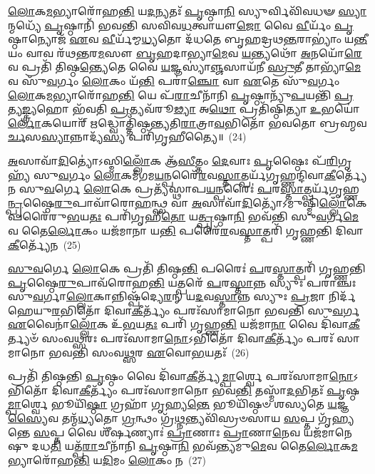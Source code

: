 \-\ul{𑌲𑍋}\-𑌕\-\ul{𑌮}\-𑌭𑍍𑌯𑌾𑌰𑍋᳴𑌹\-\ul{𑌨𑍍𑌤𑌿} 𑌯\-\ul{𑌦}\-𑌨𑍍𑌯𑌤𑌃᳴ \ul{𑌪𑍃}\-𑌷𑍍𑌠𑌾\-\ul{𑌨𑌿} 𑌸𑍍𑌯𑍁𑌰𑍍𑌵𑌿𑌵𑌿᳴𑌵𑌧𑍟 \ul{𑌸𑍍𑌯𑌾}\-𑌨𑍍𑌮𑌧𑍍𑌯𑍇᳴ \ul{𑌪𑍃}\-𑌷𑍍𑌠𑌾𑌨𑌿᳴ 𑌭𑌵𑌨𑍍𑌤𑌿 𑌸𑌵𑌿𑌵\-\ul{𑌧}\-𑌤𑍍𑌵𑌾𑌯𑍗\-\ul{𑌜𑍋} 𑌵𑍈 \ul{𑌵𑍀}\-𑌰𑍍𑌯𑌂᳴ \ul{𑌪𑍃}\-𑌷𑍍𑌠𑌾𑌨𑍍𑌯𑍋𑌜᳴ \ul{𑌏}\-𑌵 \ul{𑌵𑍀}\-𑌰𑍍𑌯᳴𑌮𑍍𑌮\-\ul{𑌧𑍍𑌯}\-𑌤𑍋 𑌦᳴𑌧𑌤𑍇 𑌬𑍃𑌹𑌦𑍍𑌰𑌥\-\ul{𑌨𑍍𑌤}\-𑌰𑌾\-𑌭𑍍𑌯𑌾𑌂॑ 𑌯\-\ul{𑌨𑍍𑌤𑍀}\-𑌯𑌂 𑌵𑌾𑌵 𑌰᳴𑌥\-\ul{𑌨𑍍𑌤}\-𑌰\-\ul{𑌮}\-𑌸𑍗 \ul{𑌬𑍃}\-𑌹𑌦𑌾𑌭𑍍𑌯𑌾\-\ul{𑌮𑍇}\-𑌵 \ul{𑌯}\-𑌨𑍍𑌤𑍍𑌯𑌥𑍋᳴ \ul{𑌅}\-𑌨𑌯𑍋᳴\-\ul{𑌰𑍇}\-𑌵 𑌪𑍍𑌰𑌤𑌿᳴ 𑌤𑌿𑌷𑍍𑌠\-\ul{𑌨𑍍𑌤𑍍𑌯𑍇}\-𑌤𑍇 𑌵𑍈 \ul{𑌯}\-𑌜𑍍𑌞𑌸𑍍𑌯𑌾॑\-\ul{𑌞𑍍𑌜}\-𑌸𑌾𑌯᳴𑌨𑍀 \ul{𑌸𑍍𑌰𑍁}\-𑌤𑍀 𑌤𑌾𑌭𑍍𑌯𑌾᳴\-\ul{𑌮𑍇}\-𑌵 𑌸𑍁᳴\-\ul{𑌵}\-𑌰𑍍𑌗𑌂 \ul{𑌲𑍋}\-𑌕𑌂 𑌯᳴\-\ul{𑌨𑍍𑌤𑌿} 𑌪𑌰𑌾॑\-\ul{𑌞𑍍𑌚𑍋} 𑌵𑌾 \ul{𑌏}\-𑌤𑍇 𑌸𑍁᳴\-\ul{𑌵}\-𑌰𑍍𑌗𑌂 \ul{𑌲𑍋}\-𑌕\-\ul{𑌮}\-𑌭𑍍𑌯𑌾𑌰𑍋᳴𑌹\-\ul{𑌨𑍍𑌤𑌿} 𑌯𑍇 𑌪᳴\-\ul{𑌰𑌾}\-𑌚𑍀𑌨𑌾᳴𑌨𑌿 \ul{𑌪𑍃}\-𑌷𑍍𑌠𑌾𑌨𑍍𑌯𑍁᳴\-\ul{𑌪}\-𑌯𑌨𑍍𑌤𑌿᳴ \ul{𑌪𑍍𑌰}\-𑌤𑍍𑌯\-\ul{𑌙𑍍𑌤𑍍𑌰𑍍𑌯}\-𑌹𑍋 𑌭᳴𑌵𑌤𑌿 \ul{𑌪𑍍𑌰}\-𑌤𑍍𑌯𑌵᳴𑌰𑍂\-\ul{𑌢𑍍𑌯𑌾} 𑌅\-\ul{𑌥𑍋} 𑌪𑍍𑌰𑌤𑌿᳴𑌷𑍍𑌠𑌿𑌤𑍍𑌯𑌾 \ul{𑌉}\-𑌭𑌯𑍋॑\-\ul{𑌰𑍍𑌲𑍋}\-𑌕𑌯𑍋𑌰𑍍᳴ \ul{𑌋}\-𑌦𑍍𑌧𑍍𑌵𑍋𑌤𑍍𑌤𑌿᳴𑌷𑍍𑌠𑌨𑍍𑌤𑍍𑌯𑌤𑌿\-\ul{𑌰𑌾}\-𑌤𑍍𑌰𑌾\-\ul{𑌵}\-𑌭𑌿𑌤𑍋᳴ 𑌭𑌵𑌤𑍋 𑌬𑍍𑌰𑌹𑍍𑌮𑌵\-\ul{𑌰𑍍𑌚}\-𑌸\-\ul{𑌸𑍍𑌯𑌾}\-𑌨𑍍𑌨𑌾𑌦𑍍𑌯᳴\-\ul{𑌸𑍍𑌯} 𑌪𑌰𑌿᳴𑌗𑍃𑌹𑍀𑌤𑍍𑌯𑍈॥~(24)

{\anuvakamend[{\-\ul{𑌵𑍃}\-\-\ul{𑌞𑍍𑌜}\-\-\ul{𑌤𑍇} 𑌬𑍍𑌰\-\ul{𑌹𑍍𑌮} 𑌚𑌾𑌨𑍍𑌨᳴𑌞𑍍𑌚 𑌸𑍁\-\ul{𑌵}\-𑌰𑍍𑌗\-\ul{𑌮𑍇}\-𑌤𑍇 𑌸𑍁᳴\-\ul{𑌵}\-𑌰𑍍𑌗𑌨𑍍𑌤𑍍𑌰𑌯𑍋᳴𑌵𑌿𑍞𑌶𑌤𑌿𑌶𑍍𑌚}]}%

\-\ul{𑌅}\-𑌸𑌾𑌵𑌾᳴\-\ul{𑌦𑌿}\-𑌤𑍍𑌯𑍋॑\-𑌽𑌸𑍍𑌮𑌿\-\ul{𑌲𑍍𑌲𑍋𑌁}\-𑌕 𑌆᳴\-\ul{𑌸𑍀}\-𑌤𑍍𑌤𑌂 \ul{𑌦𑍇}\-𑌵𑌾𑌃 \ul{𑌪𑍃}\-𑌷𑍍𑌠𑍈𑌃 𑌪᳴\-\ul{𑌰𑌿}\-𑌗𑍃𑌹𑍍𑌯᳴ 𑌸𑍁\-\ul{𑌵}\-𑌰𑍍𑌗𑌂 \ul{𑌲𑍋}\-𑌕𑌮᳴𑌗𑌮\-\ul{𑌯}\-𑌨𑍍𑌪𑌰𑍈᳴\-\ul{𑌰}\-𑌵\-\ul{𑌸𑍍𑌤𑌾}\-𑌤𑍍𑌪𑌰𑍍𑌯᳴𑌗𑍃𑌹𑍍𑌣𑌨𑍍𑌦𑌿𑌵𑌾\-\ul{𑌕𑍀}\-𑌰𑍍𑌤𑍍𑌯𑍇᳴𑌨 𑌸𑍁\-\ul{𑌵}\-𑌰𑍍𑌗𑍇 \ul{𑌲𑍋}\-𑌕𑍇 𑌪𑍍𑌰𑌤𑍍𑌯᳴𑌸𑍍𑌥𑌾𑌪\-\ul{𑌯}\-𑌨𑍍𑌪𑌰𑍈𑌃॑ \ul{𑌪}\-𑌰\-\ul{𑌸𑍍𑌤𑌾}\-𑌤𑍍𑌪𑌰𑍍𑌯᳴𑌗𑍃𑌹𑍍𑌣\-\ul{𑌨𑍍𑌪𑍃}\-𑌷𑍍𑌠𑍈\-\ul{𑌰𑍁}\-𑌪𑌾𑌵𑌾᳴𑌰𑍋\-\ul{𑌹}\-𑌨𑍍𑌥𑍍𑌸 𑌵𑌾 \ul{𑌅}\-𑌸𑌾𑌵𑌾᳴\-\ul{𑌦𑌿}\-𑌤𑍍𑌯𑍋᳴\-𑌽𑌮𑍁𑌷𑍍𑌮𑌿᳴\-\ul{𑌲𑍍𑌲𑍋𑌁}\-𑌕𑍇 𑌪𑌰𑍈᳴𑌰𑍁\-\ul{𑌭}\-𑌯\-\ul{𑌤𑌃} 𑌪𑌰𑌿᳴𑌗𑍃𑌹𑍀\-\ul{𑌤𑍋} 𑌯\-\ul{𑌤𑍍𑌪𑍃}\-𑌷𑍍𑌠𑌾\-\ul{𑌨𑌿} 𑌭𑌵᳴𑌨𑍍𑌤𑌿 𑌸𑍁\-\ul{𑌵}\-𑌰𑍍𑌗\-\ul{𑌮𑍇}\-𑌵 𑌤𑍈\-\ul{𑌰𑍍𑌲𑍋}\-𑌕𑌂 𑌯𑌜᳴𑌮𑌾𑌨𑌾 𑌯\-\ul{𑌨𑍍𑌤𑌿} 𑌪𑌰𑍈᳴\-\ul{𑌰}\-𑌵\-\ul{𑌸𑍍𑌤𑌾}\-𑌤𑍍𑌪𑌰𑌿᳴ 𑌗𑍃𑌹𑍍𑌣𑌨𑍍𑌤𑌿 𑌦𑌿𑌵𑌾\-\ul{𑌕𑍀}\-𑌰𑍍𑌤𑍍𑌯𑍇᳴𑌨~(25)

\-\ul{𑌸𑍁}\-\-\ul{𑌵}\-𑌰𑍍𑌗𑍇 \ul{𑌲𑍋}\-𑌕𑍇 𑌪𑍍𑌰𑌤𑌿᳴ 𑌤𑌿𑌷𑍍𑌠\-\ul{𑌨𑍍𑌤𑌿} 𑌪𑌰𑍈𑌃॑ \ul{𑌪}\-𑌰\-\ul{𑌸𑍍𑌤𑌾}\-𑌤𑍍𑌪𑌰𑌿᳴ 𑌗𑍃𑌹𑍍𑌣𑌨𑍍𑌤𑌿 \ul{𑌪𑍃}\-𑌷𑍍𑌠𑍈\-\ul{𑌰𑍁}\-𑌪𑌾𑌵᳴𑌰𑍋𑌹\-\ul{𑌨𑍍𑌤𑌿} 𑌯𑌤𑍍𑌪𑌰𑍇᳴ \ul{𑌪}\-𑌰\-\ul{𑌸𑍍𑌤𑌾}\-𑌨𑍍𑌨 𑌸𑍍𑌯𑍁𑌃 𑌪𑌰𑌾॑𑌞𑍍𑌚𑌃 𑌸𑍁\-\ul{𑌵}\-𑌰𑍍𑌗𑌾\-\ul{𑌲𑍍𑌲𑍋}\-𑌕𑌾𑌨𑍍𑌨𑌿𑌷𑍍𑌪᳴𑌦𑍍𑌯𑍇\-\ul{𑌰}\-𑌨𑍍 𑌯\-\ul{𑌦}\-𑌵\-\ul{𑌸𑍍𑌤𑌾}\-𑌨𑍍𑌨 𑌸𑍍𑌯𑍁𑌃 \ul{𑌪𑍍𑌰}\-𑌜𑌾 𑌨𑌿𑌰𑍍𑌦᳴𑌹𑍇𑌯𑍁\-\ul{𑌰}\-𑌭𑌿𑌤𑍋᳴ 𑌦𑌿𑌵𑌾\-\ul{𑌕𑍀}\-𑌰𑍍𑌤𑍍𑌯𑌂᳴ 𑌪𑌰𑌃᳴𑌸𑌾𑌮𑌾𑌨𑍋 𑌭𑌵𑌨𑍍𑌤𑌿 𑌸𑍁\-\ul{𑌵}\-𑌰𑍍𑌗 \ul{𑌏}\-𑌵𑍈𑌨𑌾॑\-\ul{𑌲𑍍𑌲𑍋𑌁}\-𑌕 𑌉᳴\-\ul{𑌭}\-𑌯\-\ul{𑌤𑌃} 𑌪𑌰𑌿᳴ 𑌗𑍃𑌹𑍍𑌣\-\ul{𑌨𑍍𑌤𑌿} 𑌯𑌜᳴𑌮𑌾\-\ul{𑌨𑌾} 𑌵𑍈 𑌦𑌿᳴𑌵𑌾\-\ul{𑌕𑍀}\-𑌰𑍍𑌤𑍍𑌯𑍞᳴ 𑌸𑌂𑌵\-\ul{𑌥𑍍𑌸}\-𑌰𑌃 𑌪𑌰𑌃᳴𑌸𑌾𑌮𑌾\-\ul{𑌨𑍋}\-\-𑌽𑌭𑌿𑌤𑍋᳴ 𑌦𑌿𑌵𑌾\-\ul{𑌕𑍀}\-𑌰𑍍𑌤𑍍𑌯𑌂᳴ 𑌪𑌰𑌃᳴ 𑌸𑌾𑌮𑌾𑌨𑍋 𑌭𑌵𑌨𑍍𑌤𑌿 𑌸𑌂𑌵\-\ul{𑌥𑍍𑌸}\-𑌰 \ul{𑌏}\-𑌵𑍋\-\ul{𑌭}\-𑌯𑌤𑌃᳴~(26)

𑌪𑍍𑌰𑌤𑌿᳴ 𑌤𑌿𑌷𑍍𑌠𑌨𑍍𑌤𑌿 \ul{𑌪𑍃}\-𑌷𑍍𑌠𑌂 𑌵𑍈 𑌦𑌿᳴𑌵𑌾\-\ul{𑌕𑍀}\-𑌰𑍍𑌤𑍍𑌯᳴\-\ul{𑌮𑍍𑌪𑌾}\-𑌰𑍍𑌶𑍍𑌵𑍇 𑌪𑌰𑌃᳴𑌸𑌾𑌮𑌾\-\ul{𑌨𑍋}\-\-𑌽𑌭𑌿𑌤𑍋᳴ 𑌦𑌿𑌵𑌾\-\ul{𑌕𑍀}\-𑌰𑍍𑌤𑍍𑌯𑌂᳴ 𑌪𑌰𑌃᳴𑌸𑌾𑌮𑌾𑌨𑍋 𑌭𑌵\-\ul{𑌨𑍍𑌤𑌿} 𑌤𑌸𑍍𑌮𑌾᳴\-\ul{𑌦}\-𑌭𑌿𑌤𑌃᳴ \ul{𑌪𑍃}\-𑌷𑍍𑌠\-\ul{𑌮𑍍𑌪𑌾}\-𑌰𑍍𑌶𑍍𑌵𑍇 𑌭𑍂𑌯𑌿᳴\-\ul{𑌷𑍍𑌠𑌾} 𑌗𑍍𑌰𑌹𑌾᳴ 𑌗𑍃𑌹𑍍𑌯\-\ul{𑌨𑍍𑌤𑍇} 𑌭𑍂𑌯𑌿᳴𑌷𑍍𑌠𑍞 𑌶𑌸𑍍𑌯𑌤𑍇 \ul{𑌯}\-𑌜𑍍𑌞\-\ul{𑌸𑍍𑌯𑍈}\-𑌵 𑌤𑌨𑍍𑌮᳴\-\ul{𑌧𑍍𑌯}\-𑌤𑍋 \ul{𑌗𑍍𑌰}\-𑌨𑍍𑌥𑌂 𑌗𑍍𑌰᳴\-\ul{𑌥𑍍𑌨}\-𑌨𑍍𑌤𑍍𑌯𑌵𑌿᳴𑌸𑍍𑌰𑍞𑌸𑌾𑌯 \ul{𑌸}\-𑌪𑍍𑌤 𑌗𑍃᳴𑌹𑍍𑌯𑌨𑍍𑌤𑍇 \ul{𑌸}\-𑌪𑍍𑌤 𑌵𑍈 𑌶𑍀᳴𑌰𑍍\mbox{}\-\ul{𑌷}\-𑌣𑍍𑌯𑌾𑌃॑ \ul{𑌪𑍍𑌰𑌾}\-𑌣𑌾𑌃 \ul{𑌪𑍍𑌰𑌾}\-𑌣𑌾\-\ul{𑌨𑍇}\-𑌵 𑌯𑌜᳴𑌮𑌾𑌨𑍇𑌷𑍁 𑌦𑌧\-\ul{𑌤𑌿} 𑌯𑌤𑍍𑌪᳴\-\ul{𑌰𑌾}\-𑌚𑍀𑌨𑌾᳴𑌨𑌿 \ul{𑌪𑍃}\-𑌷𑍍𑌠𑌾\-\ul{𑌨𑌿} 𑌭𑌵᳴\-\ul{𑌨𑍍𑌤𑍍𑌯}\-𑌮𑍁\-\ul{𑌮𑍇}\-𑌵 𑌤𑍈\-\ul{𑌰𑍍𑌲𑍋}\-𑌕\-\ul{𑌮}\-𑌭𑍍𑌯𑌾𑌰𑍋᳴𑌹\-\ul{𑌨𑍍𑌤𑌿} 𑌯\-\ul{𑌦𑌿}\-𑌮𑌂 \ul{𑌲𑍋}\-𑌕𑌂 𑌨~(27)

